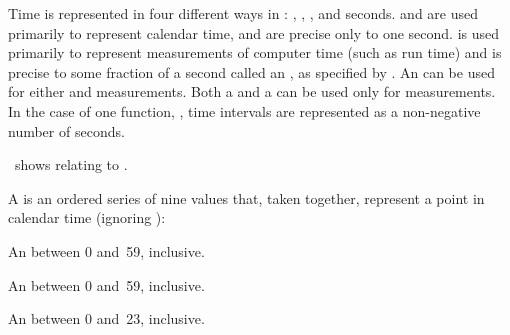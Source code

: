 Time is represented in four different ways in \clisp:
    ,
    ,
    ,
and seconds.
 and  are used primarily to represent calendar time,
and are precise only to one second.
 is used primarily to represent measurements of computer
time (such as run time) and is precise to some 
fraction of a second called an ,
as specified by .
An  can be used 
  for either  and   measurements.
Both a  and a  can be used 
  only for   measurements.
In the case of one function, ,
time intervals are represented as a non-negative  number of seconds.

\Thenextfigure\ shows  relating to .




A  is an ordered series of nine values that, taken together,
represent a point in calendar time (ignoring ):

\beginlist
{}

An  between 0 and~59, inclusive.


An  between 0 and~59, inclusive.


An  between 0 and~23, inclusive.

